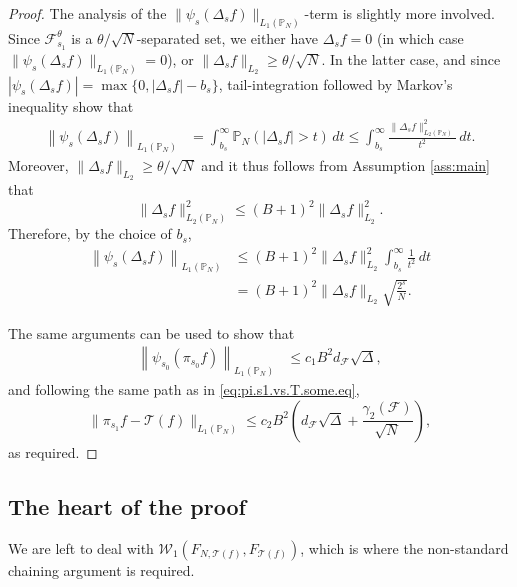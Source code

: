 \documentclass[11pt]{amsart}
\newcommand{\W}{\mathcal{W}}
\theoremstyle{definition}
\renewcommand{\P}{\mathbb{P}}
\numberwithin{equation}{section}
\begin{document}
\begin{proof}
The analysis of the  $\|\psi_{s}(\Delta_{s} f)\|_{L_{1}(\P_N)}$-term is slightly more involved.
Since $\mathcal{F}_{s_{1}}^{\theta}$ is a $\theta/\sqrt{N}$-separated set, we either have $\Delta_{s} f=0$ (in which case  $\| \psi_{s}(\Delta_sf)\|_{L_{1}(\P_{N})} =0$), or $\|\Delta_{s } f\|_{L_{2}}\geq \theta/\sqrt N$.
In the latter case, and since $|\psi_{s}(\Delta_sf)| = \max\{0,|\Delta_sf|-b_{s}\}$,  tail-integration followed by Markov's inequality show that 
\begin{align*}
 \left\| \psi_{s}(\Delta_sf) \right\|_{L_{1}(\P_{N})}
& =\int_{b_{s}}^{\infty}\P_{N}(|\Delta_{s} f|> t) \,dt 
\leq \int_{b_{s}}^{\infty} \frac{ \|\Delta_{s} f \|_{L_2(\P_N)}^{2}}{ t^{2}} \,dt .
\end{align*}
Moreover, $\| \Delta_s f\|_{L_{2}}\geq\theta/\sqrt N$ and it thus follows from Assumption \ref{ass:main} that 
\[ \|\Delta_{s} f \|_{L_2(\P_N)}^{2} 
\leq  (B+1)^{2}  \|\Delta_{s} f \|_{L_2}^{2} .\]
Therefore, by the choice of $b_{s}$,
\begin{align*}
\left\| \psi_{s}(\Delta_sf) \right\|_{L_{1}(\P_{N})}
&\leq (B+1)^{2}  \|\Delta_{s} f \|_{L_2}^{2}  \int_{b_{s}}^{\infty} \frac{1}{t^{2}} \,dt \\
&=(B+1)^{2} \|\Delta_{s} f \|_{L_2} \sqrt{\frac{2^{s}}{N}}.
\end{align*}

The same arguments can be used to show that
\begin{align*}
 \left\| \psi_{s_{0}}(\pi_{s_{0}}f) \right\|_{L_{1}(\P_{N})}
&\leq c_{1}B^{2}  d_{\mathcal{F}}  \sqrt\Delta,
\end{align*}
and following the same path as in \eqref{eq:pi.s1.vs.T.some.eq}, 
\[\| \pi_{s_1}f-\mathcal{T}(f) \|_{L_{1}(\P_{N})} 
\leq c_{2} B^{2} \left(  d_{\mathcal{F}}  \sqrt\Delta  +  \frac{\gamma_{2}(\mathcal{F})}{\sqrt N} \right),\]
as required. 
\end{proof}


\subsection{The heart of the proof}

We are left to deal with $\W_{1}(F_{N,\mathcal{T}(f)}, F_{\mathcal{T}(f)})$, which is where the non-standard chaining argument is required. 
\end{document}
